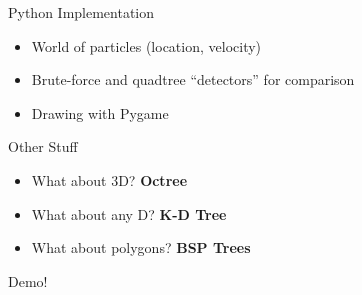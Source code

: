 \documentclass{beamer}
\begin{document}
\begin{frame}
    \huge{Python Implementation}\normalsize
    \begin{itemize}
      \item World of particles (location, velocity)
      \item Brute-force and quadtree ``detectors'' for comparison
      \item Drawing with Pygame
    \end{itemize}
\end{frame}

\begin{frame}
    \huge{Other Stuff}\normalsize
    \begin{itemize}
      \item What about 3D? \textbf{Octree}
      \item What about any D? \textbf{K-D Tree}
      \item What about polygons? \textbf{BSP Trees}
    \end{itemize}
\end{frame}

\begin{frame}
    \huge{Demo!}\normalsize
\end{frame}
\end{document}
